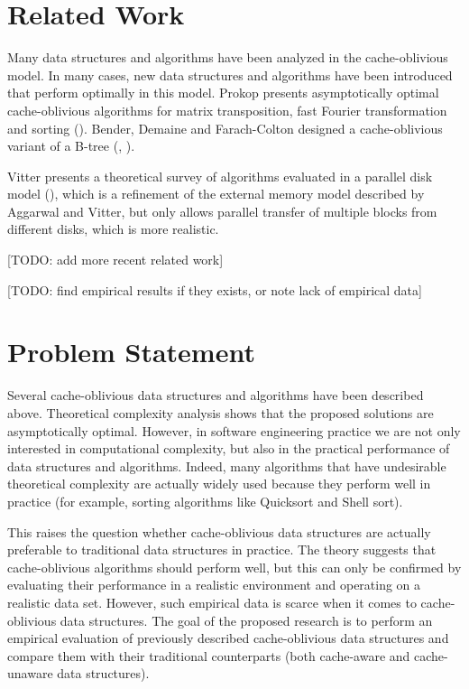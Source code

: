 \documentclass{acm_proc_article-sp}
\begin{document}
\section{Related Work}
Many data structures and algorithms have been analyzed in the cache-oblivious model. In many cases, new data structures and algorithms have been introduced that perform optimally in this model. Prokop presents asymptotically optimal cache-oblivious algorithms for matrix transposition, fast Fourier transformation and sorting (\cite{prokop1999coa}). Bender, Demaine and Farach-Colton designed a cache-oblivious variant of a B-tree (\cite{bender2005cob}, \cite{bender2004lpc}).

Vitter presents a theoretical survey of algorithms evaluated in a parallel disk model (\cite{vitter2001ema}), which is a refinement of the external memory model described by Aggarwal and Vitter, but only allows parallel transfer of multiple blocks from different disks, which is more realistic.

[TODO: add more recent related work]

[TODO: find empirical results if they exists, or note lack of empirical data]

\section{Problem Statement}
Several cache-oblivious data structures and algorithms have been described above. Theoretical complexity analysis shows that the proposed solutions are asymptotically optimal. However, in software engineering practice we are not only interested in computational complexity, but also in the practical performance of data structures and algorithms. Indeed, many algorithms that have undesirable theoretical complexity are actually widely used because they perform well in practice (for example, sorting algorithms like Quicksort and Shell sort).

This raises the question whether cache-oblivious data structures are actually preferable to traditional data structures in practice. The theory suggests that cache-oblivious algorithms should perform well, but this can only be confirmed by evaluating their performance in a realistic environment and operating on a realistic data set. However, such empirical data is scarce when it comes to cache-oblivious data structures. The goal of the proposed research is to perform an empirical evaluation of previously described cache-oblivious data structures and compare them with their traditional counterparts (both cache-aware and cache-unaware data structures).
\end{document}
